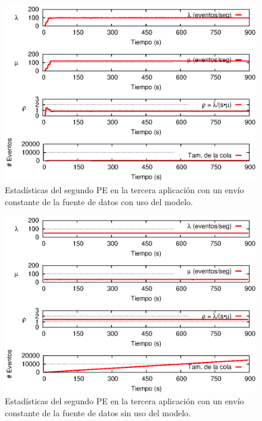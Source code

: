 \begin{figure}[!htp]
\centering
	\includegraphics[scale=1]{images/exp/app3/cm/logical/statusTwoPE.eps}
    \caption{Estad\'isticas del segundo PE en la tercera aplicaci\'on con un env\'io constante de la fuente de datos con uso del modelo.}
    \label{fig:app3-statusTwoPE-cm}
\end{figure}

\begin{figure}[!htp]
\centering
    \includegraphics[scale=1]{images/exp/app3/sm/logical/statusTwoPE.eps}
    \caption{Estad\'isticas del segundo PE en la tercera aplicaci\'on con un env\'io constante de la fuente de datos sin uso del modelo.}
    \label{fig:app3-statusTwoPE-sm}
\end{figure}

